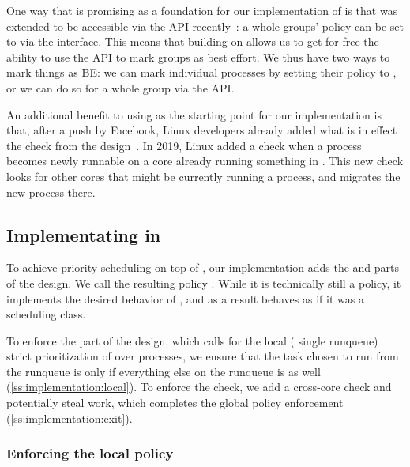 One way that \schedidle{} is promising as a foundation for our implementation of
\beclass{} is that \schedidle{} was extended to be accessible via the \cgroups{}
API recently~\cite{lkml-idle-cgroup}: a whole groups' policy can be set to
\schedidle{} via the \cgroups{} interface. This means that building on
\schedidle{} allows us to get for free the ability to use the \cgroups{} API to
mark groups as best effort. We thus have two ways to mark things as BE: we can
mark individual processes by setting their policy to \schedidle{}, or we can do
so for a whole group via the \cgroups{} API.

An additional benefit to using \schedidle{} as the starting point for our
implementation is that, after a push by Facebook, Linux developers already added
what is in effect the \entry{} check from the \beclass{}
design~\cite{fixing-idle-article}. In 2019, Linux added a check when a
\schednormal{} process becomes newly runnable on a core already running something
in \schednormal{}. This new check looks for other cores that might be currently
running a \schedidle{} process, and migrates the new process there.

\subsection{Implementating \beclass{} in \schedbe{}}

To achieve priority scheduling on top of \schedidle{}, our implementation adds
the \local{} and \exit{} parts of the \beclass{} design. We call the resulting
policy \schedbe{}. While it is technically still a policy, it implements the
desired behavior of \beclass{}, and as a result behaves as if it was a
scheduling class.

To enforce the \local{} part of the design, which calls for the local (\ie{}
single runqueue) strict prioritization of \schednormal{} over \schedbe{}
processes, we ensure that the task chosen to run from the runqueue is only
\schedbe{} if everything else on the runqueue is as well
(\autoref{ss:implementation:local}). To enforce the \exit{} check, we add a
cross-core check and potentially steal work, which completes the global policy
enforcement (\autoref{ss:implementation:exit}).

\subsubsection{Enforcing the local policy}\label{ss:implementation:local}

